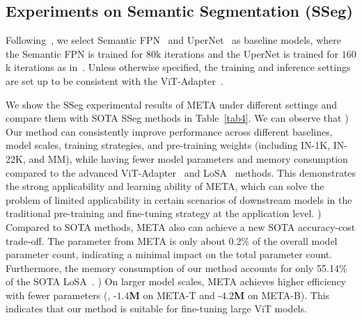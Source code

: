 \subsection{Experiments on Semantic Segmentation (SSeg)}
\label{sec4:3}
Following~\citep{chen2022vision,jie2023fact,jie2022convolutional}, we select Semantic FPN~\citep{kirillov2019panoptic} and UperNet~\citep{xiao2018unified} as baseline models, where the Semantic FPN is trained for $80$k iterations and the UperNet is trained for $160$k iterations as in~\citep{wang2021pyramid,liu2021swin}. 
Unless otherwise specified, the training and inference settings are set up to be consistent with the ViT-Adapter~\citep{chen2022vision}.


We show the SSeg experimental results of META under different settings and compare them with SOTA SSeg methods in Table~\ref{tab4}. We can observe that \emph{\textbf{}}) Our method can consistently improve performance across different baselines, model scales, training strategies, and pre-training weights (including IN-1K, IN-22K, and MM), while having fewer model parameters and memory consumption compared to the advanced ViT-Adapter~\citep{chen2022vision} and LoSA~\citep{mercea2024time} methods. This demonstrates the strong applicability and learning ability of META, which can solve the problem of limited applicability in certain scenarios of downstream models in the traditional pre-training and fine-tuning strategy at the application level. \emph{\textbf{}}) Compared to SOTA methods, META also can achieve a new SOTA accuracy-cost trade-off. The parameter from META is only about $0.2\%$ of the overall model parameter count, indicating a minimal impact on the total parameter count. Furthermore, the memory consumption of our method accounts for only 55.14\% of the SOTA LoSA~\citep{mercea2024time}.
\emph{\textbf{}}) On larger model scales, META achieves higher efficiency with fewer parameters (\eg, -$1.4$\textbf{M} on {META-T} and -$4.2$\textbf{M} on {META-B}). This indicates that our method is suitable for fine-tuning large ViT models.